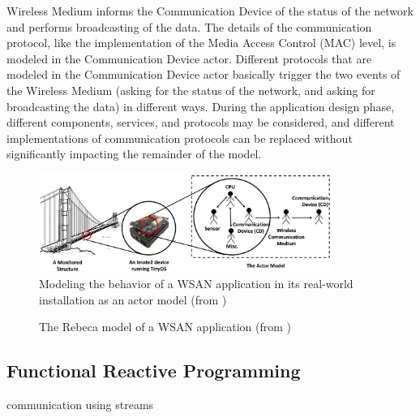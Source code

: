 \documentclass[
graybox,
envcountchap
]{svmult}
\begin{document}
\begin{bibunit}
Wireless Medium  informs the Communication Device of the status of the network and performs broadcasting of the data.
%
The details of the communication protocol, like the implementation of the Media Access Control (MAC) level, is modeled in the Communication Device actor.
Different protocols that are modeled in the Communication Device actor basically trigger the two events of the Wireless Medium (asking for the status of the network, and asking for broadcasting the data) in different ways.
%
During the application design phase, different components, services, and protocols may be considered, and different implementations of communication protocols can be replaced without significantly impacting the remainder of the model. 



\begin{figure}
\centering
\includegraphics[width=0.85\textwidth]{assets/TinyOS}
\caption{Modeling the behavior of a WSAN application in its real-world installation as an actor model 
(from \cite{DBLP:journals/sttt/KhamespanahSMA18})}
\label{fig::WSAN-actor-model}
\end{figure}

\begin{center}
\begin{figure}

\caption{The Rebeca model of a WSAN application (from \cite{DBLP:conf/birthday/Sirjani18})}
\label{fig::wsan-model}
\end{figure}
\end{center}

\subsection{Functional Reactive Programming}

    communication using streams
    

\end{bibunit}
\end{document}
